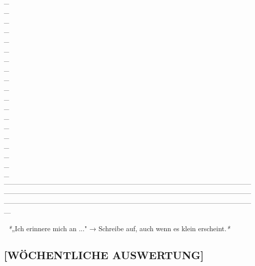 {{\\\_\\\_\\\_\\\_\\\_\\\_\\\_\\\_\\\_\\\_\\\_\\\_\\\_
\\\_\\\_\\\_\\\_\\\_\\\_
---------------------------------------------------------------------------------------------------------------------------------------------------------------------------------------------------------------------------------------------------------------------------------------------------------------------------------------

💬 \textit{*}„Ich erinnere mich an ..." → Schreibe auf, auch wenn es klein
erscheint.\textit{*}

\subsection{\textcolor{ctmmOrange}{\faCompass} \textbf{[WÖCHENTLICHE AUSWERTUNG]}}

}}
